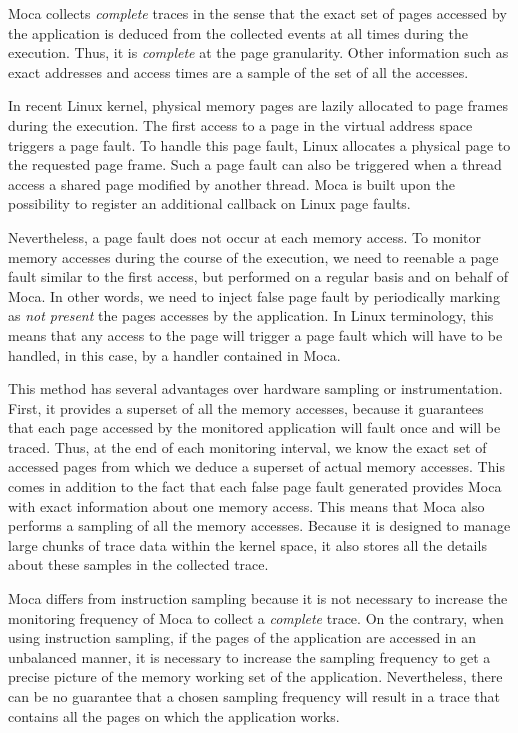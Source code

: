 \gls{Moca} collects \emph{complete} traces in the sense that the exact set of pages accessed by the application is deduced from the collected events at all times during the execution.
Thus, it is \emph{complete} at the page granularity.
Other information such as exact addresses and access times are a sample of the set of all the accesses.

In recent Linux kernel, physical memory pages are lazily allocated to page frames during the execution.
The first access to a page in the virtual address space triggers a page fault.
To handle this page fault, Linux allocates a physical page to the requested page frame.
Such a page fault can also be triggered when a thread access a shared page modified by another thread.
\gls{Moca} is built upon the possibility to register an additional callback on Linux page faults.

Nevertheless, a page fault does not occur at each memory access.
To monitor memory accesses during the course of the execution, we need to reenable a page fault similar to the first access, but performed on a regular basis and on behalf of \gls{Moca}.
In other words, we need to inject false page fault by periodically marking as \emph{not present} the pages accesses by the application.
In Linux terminology, this means that any access to the page will trigger a page fault which will have to be handled, in this case, by a handler contained in \gls{Moca}.

This method has several advantages over hardware sampling or instrumentation.
First, it provides a superset of all the memory accesses, because it guarantees that each page accessed by the monitored application will fault once and will be traced.
Thus, at the end of each monitoring interval, we know the exact set of accessed pages from which we deduce a superset of actual memory accesses.
This comes in addition to the fact that each false page fault generated provides \gls{Moca} with exact information about one memory access.
This means that \gls{Moca} also performs a sampling of all the memory accesses.
Because it is designed to manage large chunks of trace data within the kernel space, it also stores all the details about these samples in the collected trace.

\gls{Moca} differs from instruction sampling because it is not necessary to increase the monitoring frequency of \gls{Moca} to collect a \emph{complete} trace.
On the contrary, when using instruction sampling, if the pages of the application are accessed in an unbalanced manner, it is necessary to increase the sampling frequency to get a precise picture of the memory working set of the application.
Nevertheless, there can be no guarantee that a chosen sampling frequency will result in a trace that contains all the pages on which the application works.

